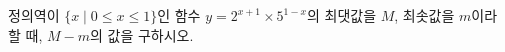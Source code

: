 정의역이 $\{x \mid 0\le x\le 1\}$인 함수 $y=2^{x+1}\times 5^{1-x}$의 최댓값을 $M$, 최솟값을 $m$이라 할 때, $M-m$의 값을 구하시오.
